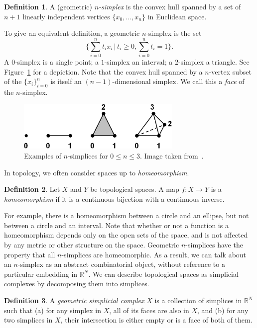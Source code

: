 \documentclass[a4paper,11pt,leqno]{article} \usepackage{amsmath}
\newcommand{\RR}{\mathbb{R}} \newcommand{\QQ}{\mathbb{Q}}
\theoremstyle{definition}
\newtheorem{defn}{Definition}
\begin{document}
\begin{defn}
A (geometric) \emph{$n$-simplex} is the convex hull spanned by a set of $n+1$
linearly independent vertices $\{x_0,\dots, x_n\}$ in Euclidean space.
\end{defn}

To give an equivalent definition, a geometric $n$-simplex is the set
$$\{\sum_{i=0}^n t_ix_i\,|\, t_i\geq 0, \sum_{i=0}^n t_i = 1\}.$$
A $0$-simplex is a single point; a $1$-simplex an interval; a $2$-simplex
a triangle.
See Figure~\ref{fig_simplices} for a depiction.
Note that the convex hull spanned by a $n$-vertex subset of the
$\{x_i\}_{i=0}^n$ is itself an $(n-1)$-dimensional simplex.
We call this a \emph{face} of the $n$-simplex.

\begin{figure} \centering
  \includegraphics[width=0.7\textwidth]{figures/simp2.jpg} \caption{Examples of
  $n$-simplices for $0\leq n\leq 3$.
  Image taken from~\cite{Friedman08}.}
\label{fig_simplices} \end{figure}

In topology, we often consider spaces up to \emph{homeomorphism}.
\begin{defn}
  Let $X$ and $Y$ be topological spaces.
  A map $f: X\to Y$ is a \emph{homeomorphism} if it is a continuous bijection
  with a continuous inverse.
\end{defn}

For example, there is a homeomorphism between a circle and an ellipse, but not
between a circle and an interval.
Note that whether or not a function is a homeomorphism depends only on the open
sets of the space, and is not affected by any metric or other structure on the
space.
Geometric $n$-simplices have the property that all $n$-simplices are
homeomorphic.
As a result, we can talk about an $n$-simplex as an abstract combinatorial
object, without reference to a particular embedding in $\RR^N$.
We can describe topological spaces as simplicial complexes by decomposing them
into simplices.

\begin{defn}
  A \emph{geometric simplicial complex} $X$ is a collection of simplices in
  $\RR^N$ such that (a) for any simplex in $X$, all of its faces are also in
  $X$, and (b) for any two simplices in $X$, their intersection is either empty
  or is a face of both of them.
\end{defn}
\end{document}
